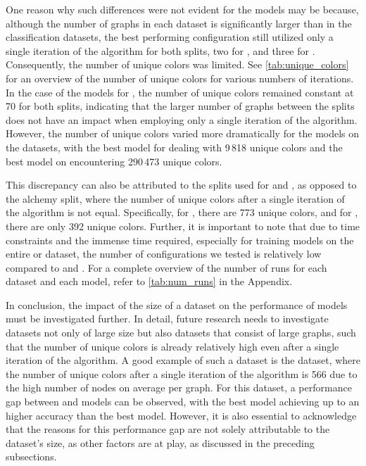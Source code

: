 One reason why such differences were not evident for the \wlnn models may be because, although the number of graphs in each dataset is significantly larger than in the classification datasets, the best performing configuration still utilized only a single iteration of the \wl algorithm for both \alchemy splits, two for \zincten, and three for \zinc. Consequently, the number of unique colors was limited. See \cref{tab:unique_colors} for an overview of the number of unique colors for various numbers of \wl iterations. In the case of the models for \alchemy, the number of unique colors remained constant at 70 for both splits, indicating that the larger number of graphs between the splits does not have an impact when employing only a single iteration of the \wl algorithm. However, the number of unique colors varied more dramatically for the models on the \zinc datasets, with the best model for \zincten dealing with 9\,818 unique colors and the best model on \zinc encountering 290\,473 unique colors.

This discrepancy can also be attributed to the splits used for \zinc and \zincten, as opposed to the alchemy split, where the number of unique colors after a single iteration of the \wl algorithm is not equal. Specifically, for \zinc, there are 773 unique colors, and for \zincten, there are only 392 unique colors. Further, it is important to note that due to time constraints and the immense time required, especially for training models on the entire \alchemy or \zinc dataset, the number of configurations we tested is relatively low compared to \zincten and \alchemyten. For a complete overview of the number of runs for each dataset and each model, refer to \cref{tab:num_runs} in the Appendix.

In conclusion, the impact of the size of a dataset on the performance of \wlnn models must be investigated further. In detail, future research needs to investigate datasets not only of large size but also datasets that consist of large graphs, such that the number of unique colors is already relatively high even after a single iteration of the \wl algorithm. A good example of such a dataset is the \reddit dataset, where the number of unique colors after a single iteration of the \wl algorithm is 566 due to the high number of nodes on average per graph. For this dataset, a performance gap between \wlnn and \gnn models can be observed, with the best \gnn model achieving up to an  higher accuracy than the best \wlnn model. However, it is also essential to acknowledge that the reasons for this performance gap are not solely attributable to the dataset's size, as other factors are at play, as discussed in the preceding subsections.

